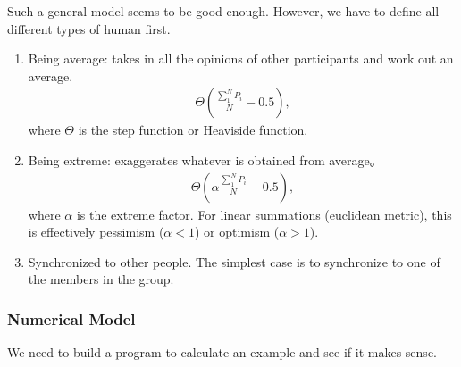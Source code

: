 \documentclass[letterpaper,10pt,english]{sphinxmanual}
\begin{document}
Such a general model seems to be good enough. However, we have to define all different types of human first.
\begin{enumerate}
\item {} 
Being average: takes in all the opinions of other participants and work out an average.
\begin{equation*}
\begin{split}\Theta(\frac{\sum_{1}^N P_i}{N}-0.5),\end{split}
\end{equation*}
where \(\Theta\) is the step function or Heaviside function.

\item {} 
Being extreme: exaggerates whatever is obtained from average。
\begin{equation*}
\begin{split}\Theta(\alpha\frac{\sum_{1}^N P_i}{N}-0.5),\end{split}
\end{equation*}
where \(\alpha\) is the extreme factor. For linear summations (euclidean metric), this is effectively pessimism (\(\alpha<1\)) or optimism (\(\alpha>1\)).

\item {} 
Synchronized to other people. The simplest case is to synchronize to one of the members in the group.

\end{enumerate}


\subsubsection{Numerical Model}
\label{\detokenize{topics/binary-human-model:numerical-model}}
We need to build a program to calculate an example and see if it makes sense.

\begin{sphinxVerbatim}[commandchars=\\\{\}]
   
\end{sphinxVerbatim}

\begin{sphinxVerbatim}[commandchars=\\\{\}]

 
      \PYG{p}{[}     \PYG{p}{]} \PYG{p}{[} \PYG{p}{]} 
\end{sphinxVerbatim}
\end{document}
